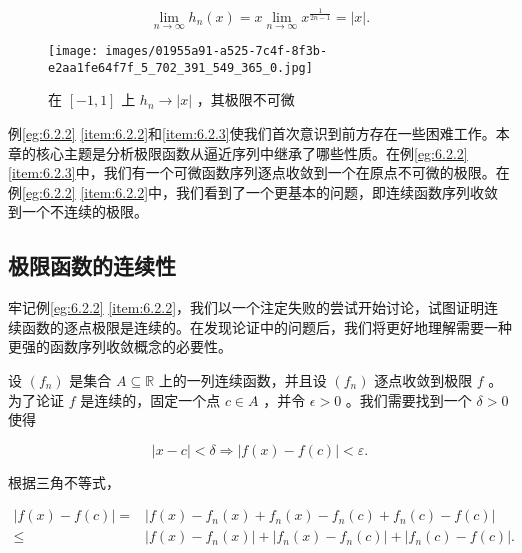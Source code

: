 \begin{Eg}
\begin{enumerate}[label = (\roman*)]
\[
\mathop{\lim }\limits_{{n \rightarrow  \infty }}{h}_{n}\left( x\right)  = x\mathop{\lim }\limits_{{n \rightarrow  \infty }}{x}^{\frac{1}{{2n} - 1}} = \left| x\right| .
\]

\begin{figure}[h]
  \centering
  \texttt{[image: images/01955a91-a525-7c4f-8f3b-e2aa1fe64f7f\_5\_702\_391\_549\_365\_0.jpg]}
  \caption{ 在 \(\left\lbrack  {-1,1}\right\rbrack\) 上 \({h}_{n} \rightarrow  \left| x\right|\) ，其极限不可微}
  \label{fig:6.3}
\end{figure}

\end{enumerate}
\end{Eg}


例\ref{eg:6.2.2} \ref{item:6.2.2}和\ref{item:6.2.3}使我们首次意识到前方存在一些困难工作。本章的核心主题是分析极限函数从逼近序列中继承了哪些性质。在例\ref{eg:6.2.2} \ref{item:6.2.3}中，我们有一个可微函数序列逐点收敛到一个在原点不可微的极限。在例\ref{eg:6.2.2} \ref{item:6.2.2}中，我们看到了一个更基本的问题，即连续函数序列收敛到一个不连续的极限。

\subsection{极限函数的连续性}

牢记例\ref{eg:6.2.2} \ref{item:6.2.2}，我们以一个注定失败的尝试开始讨论，试图证明连续函数的逐点极限是连续的。在发现论证中的问题后，我们将更好地理解需要一种更强的函数序列收敛概念的必要性。

设 \(\left( {f}_{n}\right)\) 是集合 \(A \subseteq  \mathbb{R}\) 上的一列连续函数，并且设 \(\left( {f}_{n}\right)\) 逐点收敛到极限 \(f\) 。为了论证 \(f\) 是连续的，固定一个点 \(c \in  A\) ，并令 \(\epsilon  > 0\) 。我们需要找到一个 \(\delta  > 0\) 使得

\[
\left| {x - c}\right|  < \delta \Rightarrow \left| {f\left( x\right)  - f\left( c\right) }\right|  < \varepsilon .
\]

根据三角不等式，

\begin{align*}
\left| {f\left( x\right)  - f\left( c\right) }\right|  =& \left| {f\left( x\right)  - {f}_{n}\left( x\right)  + {f}_{n}\left( x\right)  - {f}_{n}\left( c\right)  + {f}_{n}\left( c\right)  - f\left( c\right) }\right|\\
\leq &  \left| {f\left( x\right)  - {f}_{n}\left( x\right) }\right|  + \left| {{f}_{n}\left( x\right)  - {f}_{n}\left( c\right) }\right|  + \left| {{f}_{n}\left( c\right)  - f\left( c\right) }\right| .
\end{align*}

